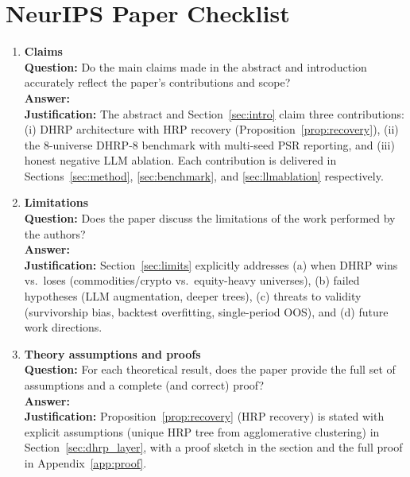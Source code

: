 %
%
%

\section*{NeurIPS Paper Checklist}

\begin{enumerate}
\item {\bf Claims}\\
\textbf{Question:} Do the main claims made in the abstract and introduction accurately reflect the paper's contributions and scope?\\
\textbf{Answer:} \answerYes{}\\
\textbf{Justification:} The abstract and Section~\ref{sec:intro} claim three contributions: (i) DHRP architecture with HRP recovery (Proposition~\ref{prop:recovery}), (ii) the 8-universe DHRP-8 benchmark with multi-seed PSR reporting, and (iii) honest negative LLM ablation. Each contribution is delivered in Sections~\ref{sec:method}, \ref{sec:benchmark}, and \ref{sec:llmablation} respectively.

\item {\bf Limitations}\\
\textbf{Question:} Does the paper discuss the limitations of the work performed by the authors?\\
\textbf{Answer:} \answerYes{}\\
\textbf{Justification:} Section~\ref{sec:limits} explicitly addresses (a) when DHRP wins vs.\ loses (commodities/crypto vs.\ equity-heavy universes), (b) failed hypotheses (LLM augmentation, deeper trees), (c) threats to validity (survivorship bias, backtest overfitting, single-period OOS), and (d) future work directions.

\item {\bf Theory assumptions and proofs}\\
\textbf{Question:} For each theoretical result, does the paper provide the full set of assumptions and a complete (and correct) proof?\\
\textbf{Answer:} \answerYes{}\\
\textbf{Justification:} Proposition~\ref{prop:recovery} (HRP recovery) is stated with explicit assumptions (unique HRP tree from agglomerative clustering) in Section~\ref{sec:dhrp_layer}, with a proof sketch in the section and the full proof in Appendix~\ref{app:proof}.


\end{enumerate}
